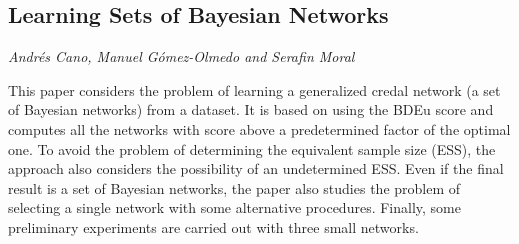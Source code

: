 \documentclass[../booklet.tex]{subfiles}
\begin{document}
\subsection[Learning Sets of Bayesian Networks. {\it Andrés Cano, Manuel Gómez-Olmedo and Serafin Moral}]{Learning Sets of Bayesian Networks}
  

\begin{center}
  {\it Andrés Cano, Manuel Gómez-Olmedo and Serafin Moral}
\end{center}

\vskip 0.8cm


This paper considers the problem of learning a  generalized credal network (a set of Bayesian networks) from a dataset. It is based on using the BDEu score and computes all the networks with score above a predetermined factor of the optimal one. To avoid the problem of determining the equivalent sample size (ESS), the approach also considers the possibility of an undetermined ESS. Even if the final result is a set of Bayesian networks, the paper also studies the problem of selecting a single network with some alternative procedures. Finally, some preliminary experiments are carried out with three small networks. 

\end{document}

